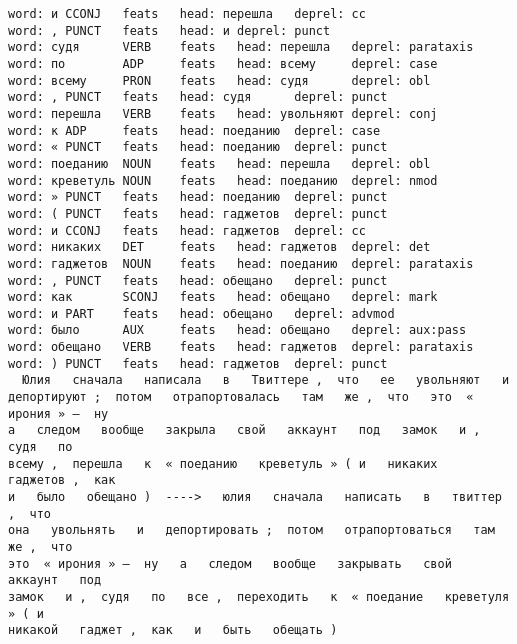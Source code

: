 \documentclass[11pt]{article}
\makeatletter
\newcommand{\boxspacing}{\kern\kvtcb@left@rule\kern\kvtcb@boxsep}
\newcommand{\prompt}[4]{
        {\ttfamily\llap{{\color{#2}[#3]:\hspace{3pt}#4}}\vspace{-\baselineskip}}
    }
\makeatother
\begin{document}
\begin{Verbatim}[commandchars=\\\{\}]
word: и CCONJ   feats   head: перешла   deprel: cc
word: , PUNCT   feats   head: и deprel: punct
word: судя      VERB    feats   head: перешла   deprel: parataxis
word: по        ADP     feats   head: всему     deprel: case
word: всему     PRON    feats   head: судя      deprel: obl
word: , PUNCT   feats   head: судя      deprel: punct
word: перешла   VERB    feats   head: увольняют deprel: conj
word: к ADP     feats   head: поеданию  deprel: case
word: « PUNCT   feats   head: поеданию  deprel: punct
word: поеданию  NOUN    feats   head: перешла   deprel: obl
word: креветуль NOUN    feats   head: поеданию  deprel: nmod
word: » PUNCT   feats   head: поеданию  deprel: punct
word: ( PUNCT   feats   head: гаджетов  deprel: punct
word: и CCONJ   feats   head: гаджетов  deprel: cc
word: никаких   DET     feats   head: гаджетов  deprel: det
word: гаджетов  NOUN    feats   head: поеданию  deprel: parataxis
word: , PUNCT   feats   head: обещано   deprel: punct
word: как       SCONJ   feats   head: обещано   deprel: mark
word: и PART    feats   head: обещано   deprel: advmod
word: было      AUX     feats   head: обещано   deprel: aux:pass
word: обещано   VERB    feats   head: гаджетов  deprel: parataxis
word: ) PUNCT   feats   head: гаджетов  deprel: punct
  Юлия   сначала   написала   в   Твиттере ,  что   ее   увольняют   и
депортируют ;  потом   отрапортовалась   там   же ,  что   это  « ирония » –  ну
а   следом   вообще   закрыла   свой   аккаунт   под   замок   и ,  судя   по
всему ,  перешла   к  « поеданию   креветуль » ( и   никаких   гаджетов ,  как
и   было   обещано )  ---->   юлия   сначала   написать   в   твиттер ,  что
она   увольнять   и   депортировать ;  потом   отрапортоваться   там   же ,  что
это  « ирония » –  ну   а   следом   вообще   закрывать   свой   аккаунт   под
замок   и ,  судя   по   все ,  переходить   к  « поедание   креветуля » ( и
никакой   гаджет ,  как   и   быть   обещать )
    \end{Verbatim}

    \begin{tcolorbox}[breakable, size=fbox, boxrule=1pt, pad at break*=1mm,colback=cellbackground, colframe=cellborder]
\prompt{In}{incolor}{ }{\boxspacing}
\begin{Verbatim}[commandchars=\\\{\}]

\end{Verbatim}
\end{tcolorbox}


    
    
    
\end{document}
